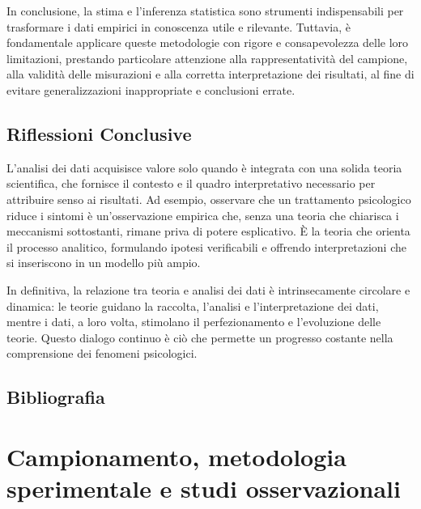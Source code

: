 \documentclass[
  letterpaper,
]{krantz}
\begin{document}
In conclusione, la stima e l'inferenza statistica sono strumenti
indispensabili per trasformare i dati empirici in conoscenza utile e
rilevante. Tuttavia, è fondamentale applicare queste metodologie con
rigore e consapevolezza delle loro limitazioni, prestando particolare
attenzione alla rappresentatività del campione, alla validità delle
misurazioni e alla corretta interpretazione dei risultati, al fine di
evitare generalizzazioni inappropriate e conclusioni errate.

\section{Riflessioni Conclusive}\label{riflessioni-conclusive}

L'analisi dei dati acquisisce valore solo quando è integrata con una
solida teoria scientifica, che fornisce il contesto e il quadro
interpretativo necessario per attribuire senso ai risultati. Ad esempio,
osservare che un trattamento psicologico riduce i sintomi è
un'osservazione empirica che, senza una teoria che chiarisca i
meccanismi sottostanti, rimane priva di potere esplicativo. È la teoria
che orienta il processo analitico, formulando ipotesi verificabili e
offrendo interpretazioni che si inseriscono in un modello più ampio.

In definitiva, la relazione tra teoria e analisi dei dati è
intrinsecamente circolare e dinamica: le teorie guidano la raccolta,
l'analisi e l'interpretazione dei dati, mentre i dati, a loro volta,
stimolano il perfezionamento e l'evoluzione delle teorie. Questo dialogo
continuo è ciò che permette un progresso costante nella comprensione dei
fenomeni psicologici.

\section*{Bibliografia}\label{bibliografia-1}


\chapter{Campionamento, metodologia sperimentale e studi
osservazionali}\label{sec-key-notions-design}
\end{document}
